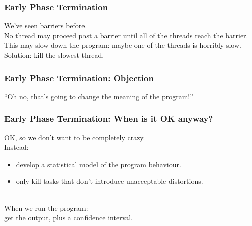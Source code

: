 \begin{frame}
  \frametitle{Early Phase Termination}



  We've seen barriers before.\\

  No thread may proceed past a barrier until all of the threads
reach the barrier.\\[1em]

  This may slow down the program: maybe one of the threads is horribly
  slow.\\[1em]

  Solution: kill the slowest thread.


\end{frame}

\begin{frame}
  \frametitle{Early Phase Termination: Objection}

\Huge
\begin{center}
``Oh no, that's going to change the meaning of the program!''
\end{center}
\end{frame}

\begin{frame}
  \frametitle{Early Phase Termination: When is it OK anyway?}


OK, so we don't want to be completely crazy.\\[1em]

Instead: 
\begin{itemize}
\item develop a statistical model of the program behaviour.
\item only kill tasks that don't introduce unacceptable distortions.
\end{itemize}

~\\[1em]

When we run the program: \\ \qquad get the output, plus a confidence interval.



\end{frame}



